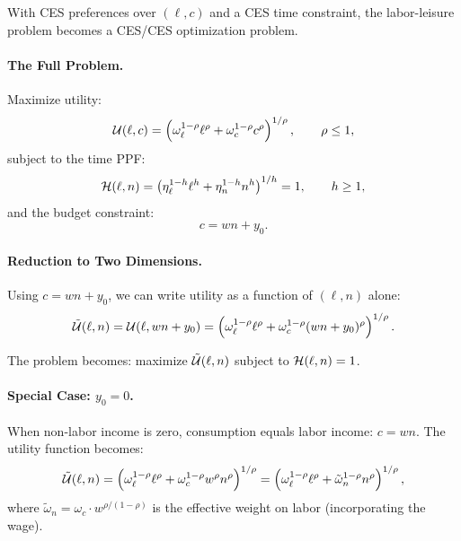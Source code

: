 With CES preferences over $(\ell, c)$ and a CES time constraint, the labor-leisure problem becomes a CES/CES optimization problem.

\paragraph{The Full Problem.}
Maximize utility:
\begin{equation}
\mathcal{U}(\ell, c) = \left( \omega_\ell^{1-\rho} \ell^\rho + \omega_c^{1-\rho} c^\rho \right)^{1/\rho}, \qquad \rho \leq 1,
\label{eq:utility-ppf}
\end{equation}
subject to the time PPF:
\begin{equation}
\mathcal{H}(\ell, n) = \left( \eta_\ell^{1-h} \ell^h + \eta_n^{1-h} n^h \right)^{1/h} = 1, \qquad h \geq 1,
\label{eq:constraint-ppf}
\end{equation}
and the budget constraint:
\begin{equation}
c = wn + y_0.
\label{eq:budget-ppf}
\end{equation}

\paragraph{Reduction to Two Dimensions.}
Using $c = wn + y_0$, we can write utility as a function of $(\ell, n)$ alone:
\begin{equation}
\tilde{\mathcal{U}}(\ell, n) = \mathcal{U}(\ell, wn + y_0) = \left( \omega_\ell^{1-\rho} \ell^\rho + \omega_c^{1-\rho} (wn + y_0)^\rho \right)^{1/\rho}.
\label{eq:utility-reduced}
\end{equation}

The problem becomes: maximize $\tilde{\mathcal{U}}(\ell, n)$ subject to $\mathcal{H}(\ell, n) = 1$.

\paragraph{Special Case: $y_0 = 0$.}
When non-labor income is zero, consumption equals labor income: $c = wn$. The utility function becomes:
\begin{equation}
\tilde{\mathcal{U}}(\ell, n) = \left( \omega_\ell^{1-\rho} \ell^\rho + \omega_c^{1-\rho} w^\rho n^\rho \right)^{1/\rho} = \left( \omega_\ell^{1-\rho} \ell^\rho + \tilde{\omega}_n^{1-\rho} n^\rho \right)^{1/\rho},
\label{eq:utility-y0-zero}
\end{equation}
where $\tilde{\omega}_n = \omega_c \cdot w^{\rho/(1-\rho)}$ is the effective weight on labor (incorporating the wage).

